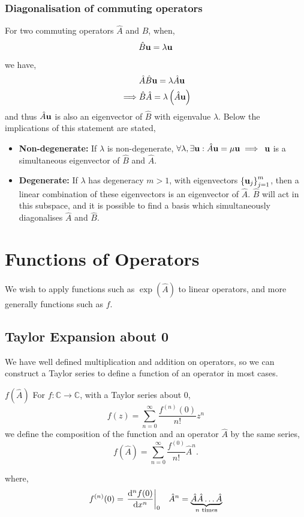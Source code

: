 \documentclass{book}
\begin{document}
\subsubsection{Diagonalisation of commuting operators}
For two commuting operators $\hat{A}$ and $\hat{B}$, when,
\begin{equation}
	\hat{B} \vb{u} = \lambda \vb{u}
\end{equation}
we have,
\begin{equation}
	\begin{split}
		& \hat{A}\hat{B}\vb{u} = \lambda\hat{A}\vb{u} \\
		\implies & \hat{B}\hat{A} = \lambda \left(\hat{A}\vb{u}\right)
	\end{split}
\end{equation}
and thus $\hat{A}\vb{u}$ is also an eigenvector of $\hat{B}$ with eigenvalue $\lambda$. Below the implications of this statement are stated,
\begin{itemize}
	\item \textbf{Non-degenerate:} If $\lambda$ is non-degenerate, $\forall\lambda, \exists\vb{u} : \hat{A}\vb{u} = \mu\vb{u} \implies$ $\vb{u}$ is a simultaneous eigenvector of $\hat{B}$ and $\hat{A}$.
	\item \textbf{Degenerate:} If $\lambda$ has degeneracy $m > 1$, with eigenvectors $\left\{\vb{u}_j\right\}_{j=1}^m$, then a linear combination of these eigenvectors is an eigenvector of $\hat{A}$. $\hat{B}$ will act in this subspace, and it is possible to find a basis which simultaneously diagonalises $\hat{A}$ and $\hat{B}$.
\end{itemize}
\section{Functions of Operators}
We wish to apply functions such as $\exp(\hat{A})$ to linear operators, and more generally functions such as $f$. 
\subsection{Taylor Expansion about 0}
We have well defined multiplication and addition on operators, so we can construct a Taylor series to define a function of an operator in most cases.
\begin{Definitions}{$f(\hat{A})$}{}
	For $f : \mathbb{C} \to \mathbb{C}$, with a Taylor series about $0$,
	\begin{equation}
		f(z) = \sum_{n=0}^{\infty}\frac{f^{(n)}(0)}{n!}z^n
	\end{equation}
	we define the composition of the function and an operator $\hat{A}$ by the same series,
	\begin{equation}
		f(\hat{A}) = \sum_{n=0}^{\infty}\frac{f^{(0)}}{n!}\hat{A}^n.
	\end{equation}
\end{Definitions}
where,
\begin{align}
	f^{(n)}(0) = \eval{\dv[n]{f(0)}{x}}_{0} && \hat{A}^n = \underbrace{\hat{A}\hat{A}\ldots\hat{A}}_{n\text{ times}}
\end{align}
\end{document}
